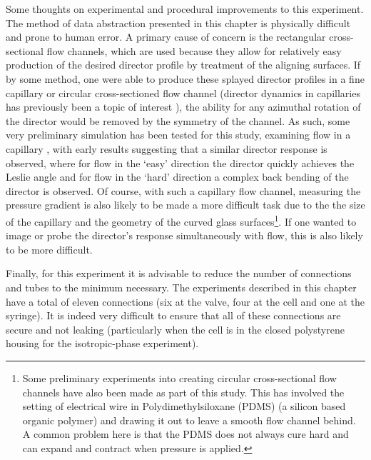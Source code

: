 Some thoughts on experimental and procedural improvements to this experiment. The method of data abstraction presented in this chapter is physically difficult and prone to human error. A primary cause of concern is the rectangular cross-sectional flow channels, which are used because they allow for relatively easy production of the desired director profile by treatment of the aligning surfaces. If by some method, one were able to produce these splayed director profiles in a fine capillary or circular cross-sectioned flow channel (director dynamics in capillaries has previously been a topic of interest \cite{Cladis1972,Palffy-muhoray1993,Ziherl1996}), the ability for any azimuthal rotation of the director would be removed by the symmetry of the channel. As such, some very preliminary simulation has been tested for this study, examining flow in a capillary \cite{Athertona}, with early results suggesting that a similar director response is observed, where for flow in the `easy' direction the director quickly achieves the Leslie angle and for flow in the `hard' direction a complex back bending of the director is observed. Of course, with such a capillary flow channel, measuring the pressure gradient is also likely to be made a more difficult task due to the the size of the capillary and the geometry of the curved glass surfaces\footnote{Some preliminary experiments into creating circular cross-sectional flow channels have also been made as part of this study. This has involved the setting of electrical wire in Polydimethylsiloxane (PDMS) (a silicon based organic polymer) and drawing it out to leave a smooth flow channel behind. A common problem here is that the PDMS does not always cure hard and can expand and contract when pressure is applied.}. If one wanted to image or probe the director's response simultaneously with flow, this is also likely to be more difficult.

Finally, for this experiment it is advisable to reduce the number of connections and tubes to the minimum necessary. The experiments described in this chapter have a total of eleven connections (six at the valve, four at the cell and one at the syringe). It is indeed very difficult to ensure that all of these connections are secure and not leaking (particularly when the cell is in the closed polystyrene housing for the isotropic-phase experiment).
